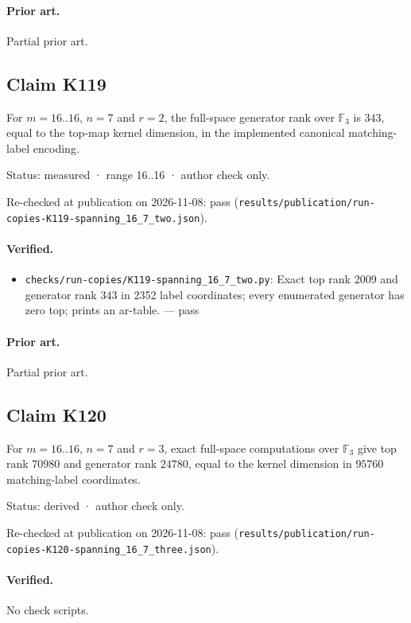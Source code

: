 \documentclass{article}
\begin{document}
\paragraph{Prior art.} Partial prior art.

\subsection*{Claim K119}

For $m=16..16$, $n=7$ and $r=2$, the full-space generator rank over $\mathbb F_3$ is $343$, equal to the top-map kernel dimension, in the implemented canonical matching-label encoding.

Status: measured · range 16..16 · author check only.

Re-checked at publication on 2026-11-08: pass (\texttt{results/publication/run-copies-K119-spanning\_16\_7\_two.json}).

\paragraph{Verified.}
\begin{itemize}
\item \texttt{checks/run-copies/K119-spanning\_16\_7\_two.py}: Exact top rank 2009 and generator rank 343 in 2352 label coordinates; every enumerated generator has zero top; prints an ar-table. --- pass
\end{itemize}

\paragraph{Prior art.} Partial prior art.

\subsection*{Claim K120}

For $m=16..16$, $n=7$ and $r=3$, exact full-space computations over $\mathbb F_3$ give top rank $70980$ and generator rank $24780$, equal to the kernel dimension in $95760$ matching-label coordinates.

Status: derived · author check only.

Re-checked at publication on 2026-11-08: pass (\texttt{results/publication/run-copies-K120-spanning\_16\_7\_three.json}).

\paragraph{Verified.}
No check scripts.
\end{document}
